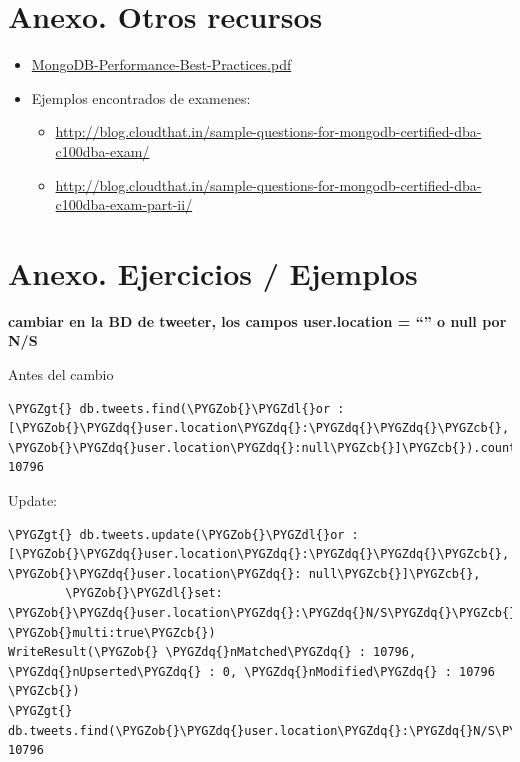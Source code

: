 \documentclass[a4paper,10pt,english]{sphinxmanual}
\def\PYGZob{\char`\{}
\def\PYGZcb{\char`\}}
\def\PYGZgt{\char`\>}
\def\PYGZdl{\char`\$}
\def\PYGZdq{\char`\"}
\begin{document}
\chapter{Anexo. Otros recursos}
\label{contents/recursos::doc}\label{contents/recursos:anexo-otros-recursos}\begin{itemize}
\item {} 
\href{http://info.mongodb.com/rs/mongodb/images/MongoDB-Performance-Best-Practices.pdf}{MongoDB-Performance-Best-Practices.pdf}

\item {} 
Ejemplos encontrados de examenes:
\begin{itemize}
\item {} 
\href{http://blog.cloudthat.in/sample-questions-for-mongodb-certified-dba-c100dba-exam/}{http://blog.cloudthat.in/sample-questions-for-mongodb-certified-dba-c100dba-exam/}

\item {} 
\href{http://blog.cloudthat.in/sample-questions-for-mongodb-certified-dba-c100dba-exam-part-ii/}{http://blog.cloudthat.in/sample-questions-for-mongodb-certified-dba-c100dba-exam-part-ii/}

\end{itemize}

\end{itemize}


\chapter{Anexo. Ejercicios / Ejemplos}
\label{contents/ejercicios::doc}\label{contents/ejercicios:anexo-ejercicios-ejemplos}
\textbf{cambiar en la BD de tweeter, los campos user.location = ``'' o null por N/S}

Antes del cambio

\begin{Verbatim}[commandchars=\\\{\}]
\PYGZgt{} db.tweets.find(\PYGZob{}\PYGZdl{}or : [\PYGZob{}\PYGZdq{}user.location\PYGZdq{}:\PYGZdq{}\PYGZdq{}\PYGZcb{}, \PYGZob{}\PYGZdq{}user.location\PYGZdq{}:null\PYGZcb{}]\PYGZcb{}).count()
10796
\end{Verbatim}

Update:

\begin{Verbatim}[commandchars=\\\{\}]
\PYGZgt{} db.tweets.update(\PYGZob{}\PYGZdl{}or : [\PYGZob{}\PYGZdq{}user.location\PYGZdq{}:\PYGZdq{}\PYGZdq{}\PYGZcb{}, \PYGZob{}\PYGZdq{}user.location\PYGZdq{}: null\PYGZcb{}]\PYGZcb{},
        \PYGZob{}\PYGZdl{}set: \PYGZob{}\PYGZdq{}user.location\PYGZdq{}:\PYGZdq{}N/S\PYGZdq{}\PYGZcb{}\PYGZcb{}, \PYGZob{}multi:true\PYGZcb{})
WriteResult(\PYGZob{} \PYGZdq{}nMatched\PYGZdq{} : 10796, \PYGZdq{}nUpserted\PYGZdq{} : 0, \PYGZdq{}nModified\PYGZdq{} : 10796 \PYGZcb{})
\PYGZgt{} db.tweets.find(\PYGZob{}\PYGZdq{}user.location\PYGZdq{}:\PYGZdq{}N/S\PYGZdq{}\PYGZcb{}).count()
10796
\end{Verbatim}
\end{document}
